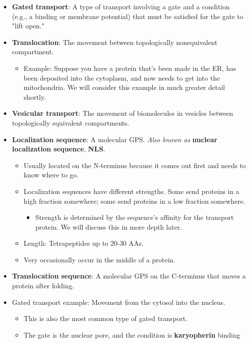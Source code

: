 \documentclass[../notes.tex]{subfiles}
\begin{document}
\begin{itemize}
\begin{itemize}
    \end{itemize}
    \item \textbf{Gated transport}: A type of transport involving a gate and a condition (e.g., a binding or membrane potential) that must be satisfied for the gate to "lift open."
    \item \textbf{Translocation}: The movement between topologically nonequivalent compartment.
    \begin{itemize}
        \item Example: Suppose you have a protein that's been made in the ER, has been deposited into the cytoplasm, and now needs to get into the mitochondria. We will consider this example in much greater detail shortly.
    \end{itemize}
    \item \textbf{Vesicular transport}: The movement of biomolecules in vesicles between topologically equivalent compartments.
    \item \textbf{Localization sequence}: A molecular GPS. \emph{Also known as} \textbf{nuclear localization sequence}, \textbf{NLS}.
    \begin{itemize}
        \item Usually located on the N-terminus because it comes out first and needs to know where to go.
        \item Localization sequences have different strengths. Some send proteins in a high fraction somewhere; some send proteins in a low fraction somewhere.
        \begin{itemize}
            \item Strength is determined by the sequence's affinity for the transport protein. We will discuss this in more depth later.
        \end{itemize}
        \item Length: Tetrapeptides up to 20-30 AAs.
        \item Very occasionally occur in the middle of a protein.
    \end{itemize}
    \item \textbf{Translocation sequence}: A molecular GPS on the C-terminus that moves a protein after folding.
    \item Gated transport example: Movement from the cytosol into the nucleus.
    \begin{itemize}
        \item This is also the most common type of gated transport.
        \item The gate is the nuclear pore, and the condition is \textbf{karyopherin} binding

\end{itemize}
\end{itemize}
\end{document}
